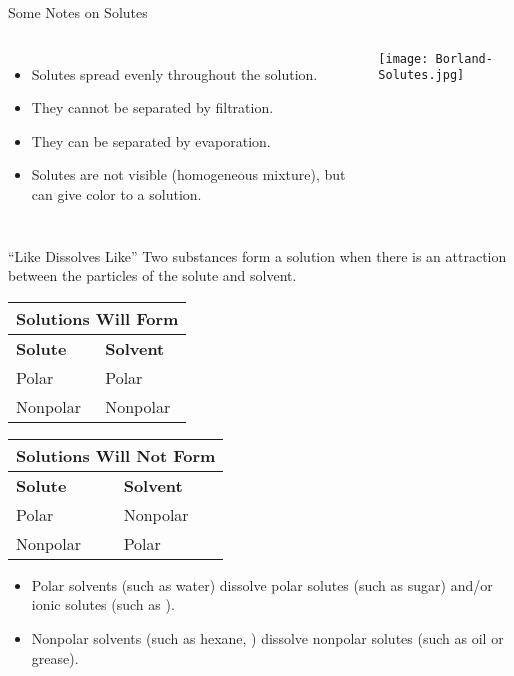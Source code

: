\documentclass[11pt,letterpaper]{article}
\begin{document}
\begin{frame}{Some Notes on Solutes}
	\begin{columns}
		\begin{itemize}
			\item Solutes spread \alert{evenly} throughout the
				solution.
			\item They cannot be separated by filtration.
			\item They \alert{can} be separated by evaporation.
			\item Solutes are not visible (homogeneous mixture), but
				can give color to a solution.
		\end{itemize}
		\begin{center}
			\texttt{[image: Borland-Solutes.jpg]}
		\end{center}
	\end{columns}
\end{frame}

\begin{frame}{``Like Dissolves Like''}
	Two substances form a solution when there is an attraction between the
	particles of the solute and solvent.

	\begin{center}
		\begin{tabular} {l l}
			\toprule
			\multicolumn{2}{c}{\bfseries Solutions Will
			Form} \\ \midrule
			\bfseries Solute & \bfseries Solvent \\ \midrule
			Polar & Polar \\
			Nonpolar & Nonpolar \\
			\bottomrule
		\end{tabular}
		\qquad
		\begin{tabular} {l l}
			\toprule
			\multicolumn{2}{c}{\bfseries Solutions Will
			Not Form} \\ \midrule
			\bfseries Solute & \bfseries Solvent \\ \midrule
			Polar & Nonpolar \\
			Nonpolar & Polar \\
			\bottomrule
		\end{tabular}
	\end{center}

	\begin{itemize}
		\item \alert{Polar} solvents (such as water) dissolve
			\alert{polar} solutes (such as sugar) and/or \alert{ionic}
			solutes (such as ).
		\item \alert{Nonpolar} solvents (such as hexane, )
			dissolve \alert{nonpolar} solutes (such as oil or
			grease).
	\end{itemize}
\end{frame}
\end{document}
